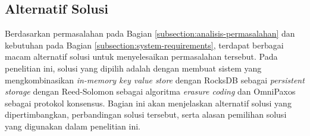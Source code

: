 \subsection{Alternatif Solusi}
\label{subsection:alternatif-solusi}

Berdasarkan permasalahan pada Bagian \ref{subsection:analisis-permasalahan} dan kebutuhan pada Bagian \ref{subsection:system-requirements}, terdapat berbagai macam alternatif solusi untuk menyelesaikan permasalahan tersebut. Pada penelitian ini, solusi yang dipilih adalah dengan membuat sistem yang mengkombinasikan \textit{in-memory key value store} dengan RocksDB sebagai \textit{persistent storage} dengan Reed-Solomon sebagai algoritma \textit{erasure coding} dan OmniPaxos sebagai protokol konsensus. Bagian ini akan menjelaskan alternatif solusi yang dipertimbangkan, perbandingan solusi tersebut, serta alasan pemilihan solusi yang digunakan dalam penelitian ini.







